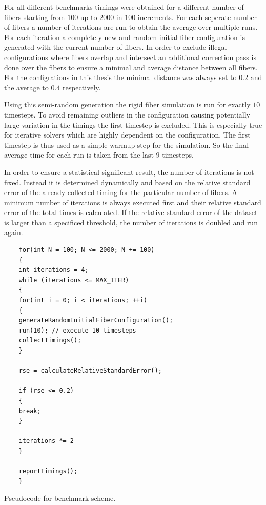 \documentclass[a4paper,11pt]{kth-mag}
\begin{document}
For all different benchmarks timings were obtained for a different number of fibers starting from $100$ up to $2000$ in $100$ increments. For each seperate number of fibers a number of iterations are run to obtain the average over multiple runs. For each iteration a completely new and random initial fiber configuration is generated with the current number of fibers. In order to exclude illegal configurations where fibers overlap and intersect an additional correction pass is done over the fibers to ensure a minimal and average distance between all fibers. For the configrations in this thesis the minimal distance was always set to $0.2$ and the average to $0.4$ respectively.

Using this semi-random generation the rigid fiber simulation is run for exactly $10$ timesteps. To avoid remaining outliers in the configuration causing potentially large variation in the timings the first timestep is excluded. This is especially true for iterative solvers which are highly dependent on the configuration. The first timestep is thus used as a simple warmup step for the simulation. So the final average time for each run is taken from the last $9$ timesteps.

In order to ensure a statistical significant result, the number of iterations is not fixed. Instead it is determined dynamically and based on the relative standard error of the already collected timing for the particular number of fibers. A minimum number of iterations is always executed first and their relative standard error of the total times is calculated. If the relative standard error of the dataset is larger than a specificed threshold, the number of iterations is doubled and run again.

\begin{listing}
  \centering
  \begin{verbatim}
    for(int N = 100; N <= 2000; N += 100)
    {
    int iterations = 4;
    while (iterations <= MAX_ITER)
    {
    for(int i = 0; i < iterations; ++i)
    {
    generateRandomInitialFiberConfiguration();
    run(10); // execute 10 timesteps
    collectTimings();
    }

    rse = calculateRelativeStandardError();

    if (rse <= 0.2)
    {
    break;
    }

    iterations *= 2
    }

    reportTimings();
    }
  \end{verbatim}
  \caption{Pseudocode for benchmark scheme.}
  \label{lst:pseudo_benchmark}
\end{listing}
\end{document}
